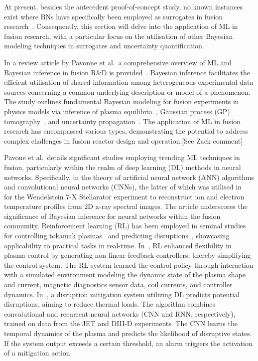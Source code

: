 \documentclass[journal]{IEEEtran}
\begin{document}
At present, besides the antecedent proof-of-concept study, no known instances exist where BNs have specifically been employed as surrogates in fusion research~\cite{Griffiths2024}. Consequently, this section will delve into the application of ML in fusion research, with a particular focus on the utilisation of other Bayesian modeling techniques in surrogates and uncertainty quantification.

In a review article by Pavonne et al.\ a comprehensive overview of ML and Bayesian inference in fusion R\&D is provided~\cite{Pavone2023}. Bayesian inference facilitates the efficient utilisation of shared information among heterogeneous experimental data sources concerning a common underlying description or model of a phenomenon. The study outlines fundamental Bayesian modeling for fusion experiments in physics models via inference of plasma equilibria~\cite{Svensson2003, Svensson2004}, Gaussian process (GP) tomography~\cite{Svensson2011}, and uncertainty propagation~\cite{Fischer2020, Fischer2010}. The application of ML in fusion research has encompassed various types, demonstrating the potential to address complex challenges in fusion reactor design and operation.[See Zack comment]

Pavone et al.~details significant studies employing trending ML techniques in fusion, particularly within the realm of deep learning (DL) methods in neural networks. Specifically, in the theory of artificial neural network (ANN) algorithms and convolutional neural networks (CNNs), the latter of which was utilised in~\cite{Pavone2019} for the Wendelstein 7-X Stellarator experiment to reconstruct ion and electron temperature profiles from 2D x-ray spectral images. The article underscores the significance of Bayesian inference for neural networks within the fusion community. Reinforcement learning (RL) has been employed in seminal studies for controlling tokamak plasmas~\cite{Degrave2022} and predicting disruptions~\cite{Kates2019}, showcasing applicability to practical tasks in real-time. In~\cite{Degrave2022}, RL enhanced flexibility in plasma control by generating non-linear feedback controllers, thereby simplifying the control system. The RL system learned the control policy through interaction with a simulated environment modeling the dynamic state of the plasma shape and current, magnetic diagnostics sensor data, coil currents, and controller dynamics. In~\cite{Kates2019}, a disruption mitigation system utilizing DL predicts potential disruptions, aiming to reduce thermal loads. The algorithm combines convolutional and recurrent neural networks (CNN and RNN, respectively), trained on data from the JET and DIII-D experiments. The CNN learns the temporal dynamics of the plasma and predicts the likelihood of disruptive states. If the system output exceeds a certain threshold, an alarm triggers the activation of a mitigation action. 
\end{document}
